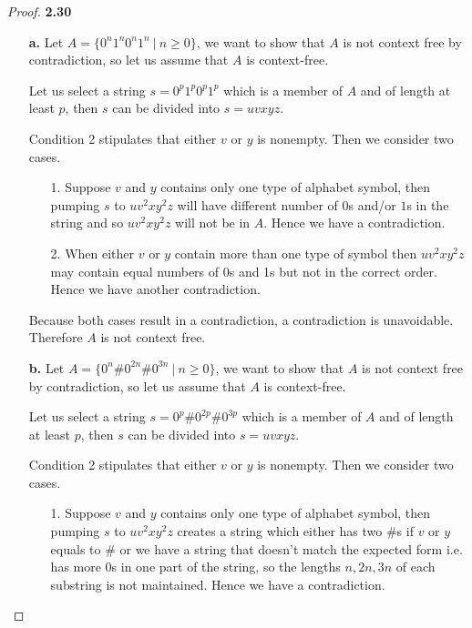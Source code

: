 \documentclass[11pt]{article}
\theoremstyle{definition}
\begin{document}
\cleardoublepage
\begin{proof}{\textbf{2.30}}
\begin{itemize}
    \item [\textbf{a.}] Let $A = \{0^n1^n0^n1^n~|~n\geq0\}$, we want to show 
    that $A$ is not context free by contradiction, so let us assume
    that $A$ is context-free.

    Let us select a string $s = 0^p1^p0^p1^p$ which is a member of $A$ and
    of length at least $p$, then $s$ can be divided into $s = uvxyz$.

    Condition 2 stipulates that either $v$ or $y$ is nonempty. Then we consider
    two cases.
    \begin{itemize}
        \item [1.] Suppose $v$ and $y$ contains only one type of alphabet
        symbol, then pumping $s$ to $uv^2xy^2z$ will have different number
        of $0$s and/or $1$s in the string and so $uv^2xy^2z$ will not be in
        $A$. Hence we have a contradiction.
        
        \item [2.] When either $v$ or $y$ contain more than one type of symbol
        then $uv^2xy^2z$ may contain equal numbers of 0s and 1s but not in the
        correct order. Hence we have another contradiction.
    \end{itemize}
    Because both cases result in a contradiction, a contradiction is
    unavoidable. Therefore $A$ is not context free.

    \item [\textbf{b.}] Let $A = \{0^n\#0^{2n}\#0^{3n}~|~n\geq0\}$, we want to
    show  that $A$ is not context free by contradiction, so let us assume
    that $A$ is context-free.

    Let us select a string $s = 0^p\#0^{2p}\#0^{3p}$ which is a member of $A$ and
    of length at least $p$, then $s$ can be divided into $s = uvxyz$.

    Condition 2 stipulates that either $v$ or $y$ is nonempty. Then we consider
    two cases.
    \begin{itemize}
        \item [1.] Suppose $v$ and $y$ contains only one type of alphabet
        symbol, then pumping $s$ to $uv^2xy^2z$ creates a string which either
        has two $\#$s if $v$ or $y$ equals to $\#$ or we have a string that
        doesn't match the expected form i.e. has more $0$s in one part of the
        string, so the lengths $n, 2n, 3n$ of each substring is not maintained.
        Hence we have a contradiction.
        

\end{itemize}
\end{itemize}
\end{proof}
\end{document}
